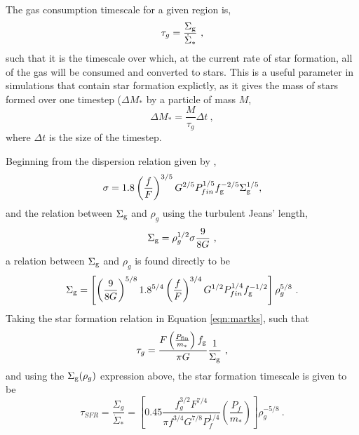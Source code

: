 The gas consumption timescale for a given region is,
\begin{equation}
\label{eqn:gcdef}
\tau_g = \frac{\Sigma_\mathrm{g}}{\dot{\Sigma}_*}~,
\end{equation}
such that it is the timescale over which, at the current rate of star formation, all of the gas will be consumed and converted to stars.
This is a useful parameter in simulations that contain star formation explictly, as it gives the mass of stars formed over one timestep ($\Delta M_*$ by a particle of mass $M$,
$$
\Delta M_* = \frac{M}{\tau_g} \Delta t~,
$$
where $\Delta t$ is the size of the timestep.

Beginning from the dispersion relation given by \citet{martizzi2015},
$$
\sigma = 1.8 \left(\frac{f}{F}\right)^{{3/5}} G^{{2/5}} P_{fin}^{{1/5}} f_\mathrm{g}^{{-2/5}} \Sigma_\mathrm{g}^{{1/5}},
$$
and the relation between $\Sigma_\mathrm{g}$ and $\rho_g$ using the turbulent Jeans' length,
$$
\Sigma_\mathrm{g} = \rho_g^{1/2} \sigma \frac{9}{8G}~,
$$
a relation between $\Sigma_\mathrm{g}$ and $\rho_g$ is found directly to be
\begin{equation}
\label{eqn:sgrhog}
\Sigma_\mathrm{g} = \left[\left(\frac{9}{8G}\right)^{5/8} 1.8^{5/4} \left(\frac{f}{F}\right)^{3/4} G^{1/2} P_{fin}^{1/4} f_\mathrm{g}^{-1/2}\right] \rho_g^{5/8} ~.
\end{equation}
Taking the star formation relation in Equation \ref{eqn:martks}, such that
$$
\tau_g = \frac{F\left(\frac{P_\mathrm{fin}}{m_*}\right)f_\mathrm{g}}{\pi G} \frac{1}{\Sigma_\mathrm{g}}~,
$$
and using the $\Sigma_\mathrm{g} ( \rho_g )$ expression above, the star formation timescale is given to be
\begin{equation}
\label{eqn:gc}
\tau_{SFR} = \frac{\Sigma_g}{\dot{\Sigma}_*} = \left[0.45 \frac{f_g^{3/2} F^{7/4}}{\pi f^{3/4} G^{7/8} P_f^{1/4}} \left(\frac{P_{f}}{m_*}\right)\right] \rho_g^{-5/8}~.
\end{equation}



